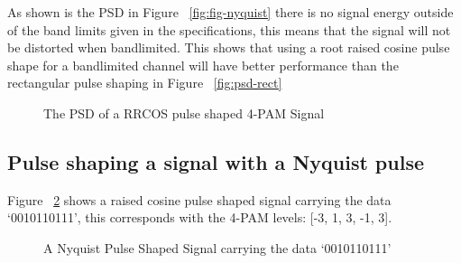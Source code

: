As shown is the PSD in Figure ~\ref{fig:fig-nyquist} there is no signal energy outside of the band limits
given in the specifications, this means that the signal will not be distorted when bandlimited. This shows
that using a root raised cosine pulse shape for a bandlimited channel will have better performance than
the rectangular pulse shaping in Figure ~\ref{fig:psd-rect}

\begin{figure}[h]
    \begin{center}
        
        \caption{The PSD of a RRCOS pulse shaped 4-PAM Signal}
        \label{fig:psd-nyquist}
    \end{center}
\end{figure}

\subsection{Pulse shaping a signal with a Nyquist pulse}

Figure ~\ref{fig:ny-pulse-shape} shows a raised cosine pulse shaped signal carrying the data `0010110111', this corresponds with the 4-PAM
levels: [-3, 1, 3, -1, 3].

\begin{figure}[H]
    \begin{center}
        
    \end{center}
    \label{fig:ny-pulse-shape}
    \caption{A Nyquist Pulse Shaped Signal carrying the data `0010110111'}
\end{figure}


    

